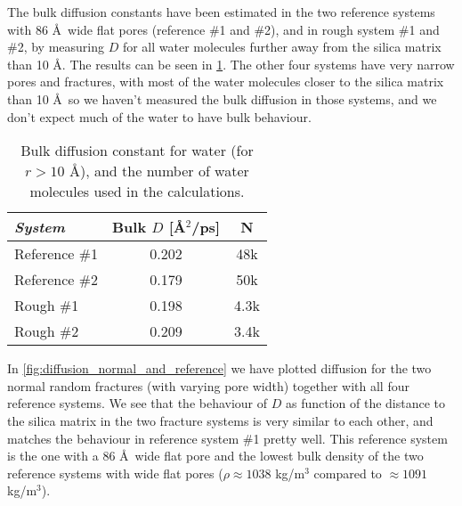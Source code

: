 The bulk diffusion constants have been estimated in the two reference systems with 86 \AA\ wide flat pores (reference \#1 and \#2), and in rough system \#1 and \#2, by measuring $D$ for all water molecules further away from the silica matrix than 10 \AA. The results can be seen in \cref{tab:bulk_water_diffusion}. The other four systems have very narrow pores and fractures, with most of the water molecules closer to the silica matrix than 10 \AA\, so we haven't measured the bulk diffusion in those systems, and we don't expect much of the water to have bulk behaviour.
%
\begin{table}[!htb]%
    \centering%
    \begin{tabular}{l|cc}%
        \textit{System} & Bulk $D$ [\AA$^2$/ps] & N    \\\hline
        Reference \#1   & 0.202                 & 48k  \\ %
        Reference \#2   & 0.179                 & 50k  \\ %
        Rough \#1       & 0.198                 & 4.3k \\ %
        Rough \#2       & 0.209                 & 3.4k \\ %
    \end{tabular}%
    \vspace{8pt}%
    \caption{%
        Bulk diffusion constant for water (for $r>10$ \AA), and the number of water molecules used in the calculations. %
        \label{tab:bulk_water_diffusion}%
    }%
\end{table}

In \cref{fig:diffusion_normal_and_reference} we have plotted diffusion for the two normal random fractures (with varying pore width) together with all four reference systems. We see that the behaviour of $D$ as function of the distance to the silica matrix in the two fracture systems is very similar to each other, and matches the behaviour in reference system \#1 pretty well. This reference system is the one with a 86 \AA\ wide flat pore and the lowest bulk density of the two reference systems with wide flat pores ($\rho \approx 1038$ kg/m$^3$ compared to $\approx 1091$ kg/m$^3$).
%

